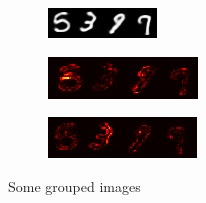\documentclass[twocolumn]{article}
\begin{document}
\begin{figure}
  \begin{subfigure}{\linewidth}
  	\centering
    \includegraphics[width=.8\linewidth]{complete40ep.png}
    \caption{}
  \end{subfigure}\par
  \begin{subfigure}{\linewidth}
  	\centering
    \includegraphics[width=.8\linewidth]{difference20ep.png}
    \caption{}  
  \end{subfigure}\par
  \begin{subfigure}{\linewidth}
  	\centering
    \includegraphics[width=.8\linewidth]{difference40ep.png}
    \caption{}
  \end{subfigure}
 \caption{Some grouped images}
\end{figure}


\end{document}
